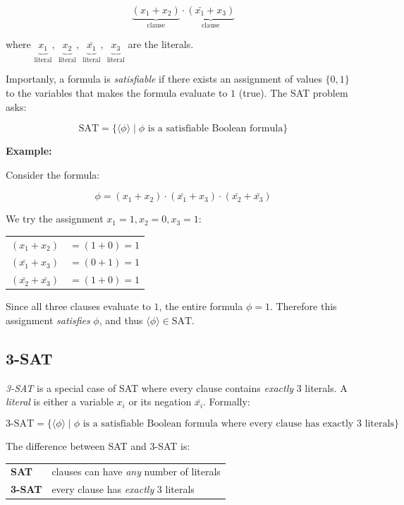\documentclass[12pt,a4paper,openany]{article}
\begin{document}
\[
\underbrace{(x_1 + x_2)}_{\text{clause}} \cdot \underbrace{(\bar{x_1} + x_3)}_{\text{clause}}
\]

where $\underbrace{x_1}_{\text{literal}},\ \underbrace{x_2}_{\text{literal}},\ \underbrace{\bar{x_1}}_{\text{literal}},\ \underbrace{x_3}_{\text{literal}}$ are the literals.

Importanly, a formula is \emph{satisfiable} if there exists an assignment of values $\{0, 1\}$ to the variables that makes the formula evaluate to $1$ (true). The SAT problem asks:

\[
\text{SAT} = \{ \langle \phi \rangle \mid \phi \text{ is a satisfiable Boolean formula} \}
\]

\textbf{Example:}

Consider the formula:

\[
\phi = (x_1 + x_2) \cdot (\bar{x_1} + x_3) \cdot (\bar{x_2} + \bar{x_3})
\]

We try the assignment $x_1 = 1, x_2 = 0, x_3 = 1$:

\begin{center}
\begin{tabular}{ll}
$(x_1 + x_2)$ & $= (1 + 0) = 1$ \\
$(\bar{x_1} + x_3)$ & $= (0 + 1) = 1$ \\
$(\bar{x_2} + \bar{x_3})$ & $= (1 + 0) = 1$ \\
\end{tabular}
\end{center}

Since all three clauses evaluate to $1$, the entire formula $\phi = 1$. Therefore this assignment \emph{satisfies} $\phi$, and thus $\langle \phi \rangle \in \text{SAT}$.

\subsection{3-SAT}

\emph{3-SAT} is a special case of SAT where every clause contains \emph{exactly} 3 literals. A \emph{literal} is either a variable $x_i$ or its negation $\bar{x_i}$. Formally:

\[
\text{3-SAT} = \{ \langle \phi \rangle \mid \phi \text{ is a satisfiable Boolean formula where every clause has exactly 3 literals} \}
\]

The difference between SAT and 3-SAT is:

\begin{center}
\begin{tabular}{ll}
\textbf{SAT} & clauses can have \emph{any} number of literals \\
\textbf{3-SAT} & every clause has \emph{exactly} 3 literals \\
\end{tabular}
\end{center}
\end{document}
